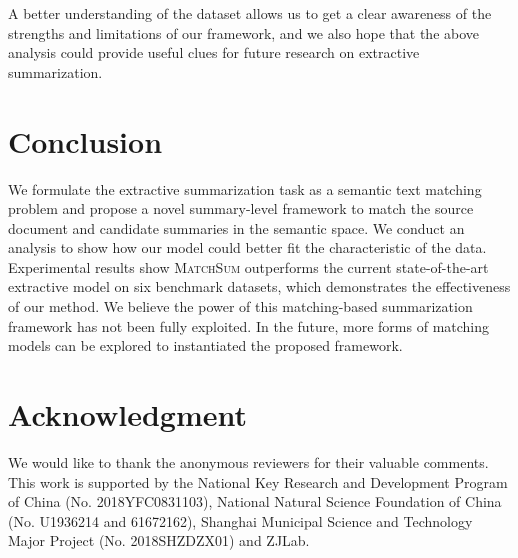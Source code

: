 \documentclass[11pt,a4paper]{article}
\begin{document}
A better understanding of the dataset allows us to get a clear awareness of the strengths and limitations of our framework, and we also hope that the above analysis could provide useful clues for future research on extractive summarization.


\section{Conclusion}
We formulate the extractive summarization task as a semantic text matching problem and propose a novel summary-level framework to match the source document and candidate summaries in the semantic space.
We conduct an analysis to show how our model could better fit the characteristic of the data. Experimental results show \textsc{MatchSum} outperforms the current state-of-the-art extractive model on six benchmark datasets, which demonstrates the effectiveness of our method. We believe the power of this matching-based summarization framework has not been fully exploited. In the future, more forms of matching models can be explored to instantiated the proposed framework.


\section*{Acknowledgment}
We would like to thank the anonymous reviewers for their valuable comments. This work is supported by the National Key Research and Development Program of China (No. 2018YFC0831103), National Natural Science Foundation of China (No. U1936214 and 61672162), Shanghai Municipal Science and Technology Major Project (No. 2018SHZDZX01) and ZJLab.




\end{document}
